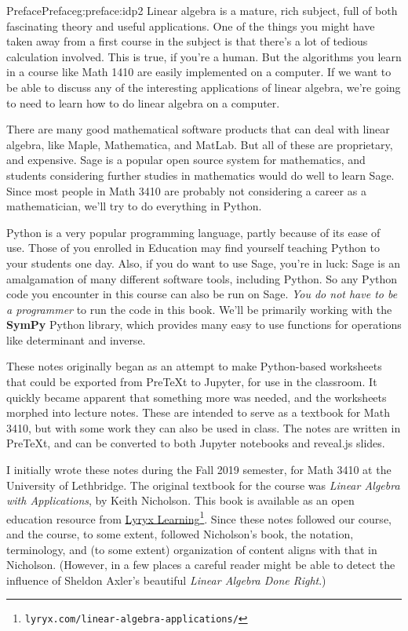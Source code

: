 \documentclass[oneside,10pt,]{book}
\newcommand{\terminology}[1]{\textbf{#1}}
\numberwithin{equation}{section}
\begin{document}
\begin{preface}{Preface}{}{Preface}{}{}{g:preface:idp2}
Linear algebra is a mature, rich subject, full of both fascinating theory and useful applications. One of the things you might have taken away from a first course in the subject is that there's a lot of tedious calculation involved. This is true, if you're a human. But the algorithms you learn in a course like Math 1410 are easily implemented on a computer. If we want to be able to discuss any of the interesting applications of linear algebra, we're going to need to learn how to do linear algebra on a computer.%
\par
There are many good mathematical software products that can deal with linear algebra, like Maple, Mathematica, and MatLab. But all of these are proprietary, and expensive. Sage is a popular open source system for mathematics, and students considering further studies in mathematics would do well to learn Sage. Since most people in Math 3410 are probably not considering a career as a mathematician, we'll try to do everything in Python.%
\par
Python is a very popular programming language, partly because of its ease of use. Those of you enrolled in Education may find yourself teaching Python to your students one day. Also, if you do want to use Sage, you're in luck: Sage is an amalgamation of many different software tools, including Python. So any Python code you encounter in this course can also be run on Sage. \emph{You do not have to be a programmer} to run the code in this book. We'll be primarily working with the \terminology{SymPy} Python library, which provides many easy to use functions for operations like determinant and inverse.%
\par
These notes originally began as an attempt to make Python-based worksheets that could be exported from PreTeXt to Jupyter, for use in the classroom. It quickly became apparent that something more was needed, and the worksheets morphed into lecture notes. These are intended to serve as a textbook for Math 3410, but with some work they can also be used in class. The notes are written in PreTeXt, and can be converted to both Jupyter notebooks and reveal.js slides.%
\par
I initially wrote these notes during the Fall 2019 semester, for Math 3410 at the University of Lethbridge. The original textbook for the course was \emph{Linear Algebra with Applications}, by Keith Nicholson. This book is available as an open education resource from \href{https://lyryx.com/linear-algebra-applications/}{Lyryx Learning}\footnote{\nolinkurl{lyryx.com/linear-algebra-applications/}\label{g:fn:idp3}}. Since these notes followed our course, and the course, to some extent, followed Nicholson's book, the notation, terminology, and (to some extent) organization of content aligns with that in Nicholson. (However, in a few places a careful reader might be able to detect the influence of Sheldon Axler's beautiful \emph{Linear Algebra Done Right}.)%
\end{preface}
\end{document}
